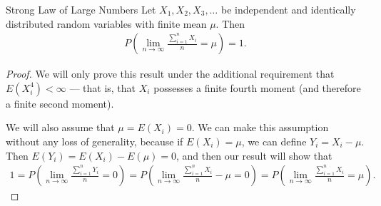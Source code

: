 \begin{thm}{Strong Law of Large Numbers}\label{slln}\proofbreak
    Let $X_1, X_2, X_3, \ldots$ be independent and identically distributed random variables with finite mean $\mu$. Then
    \begin{align*}
        P\left(\lim_{n \to \infty}\frac{\sum_{i=1}^{n}X_i}{n} = \mu\right) = 1.
    \end{align*}
\end{thm}

\begin{proof}
    We will only prove this result under the additional requirement that $E(X_i^4) < \infty$ --- that is, that $X_i$ possesses a finite fourth moment (and therefore a finite second moment).

    We will also assume that $\mu = E(X_i) = 0$. We can make this assumption without any loss of generality, because if $E(X_i) = \mu$, we can define $Y_i = X_i - \mu$. Then $E(Y_i) = E(X_i) - E(\mu) = 0$, and then our result will show that
    \begin{align*}
        1 = P\left(\lim_{n \to \infty}\frac{\sum_{i=1}^{n}Y_i}{n} = 0\right) = P\left(\lim_{n \to \infty}\frac{\sum_{i=1}^{n}X_i}{n} - \mu = 0\right) = P\left(\lim_{n \to \infty}\frac{\sum_{i=1}^{n}X_i}{n} = \mu\right).
    \end{align*}
    

\end{proof}
